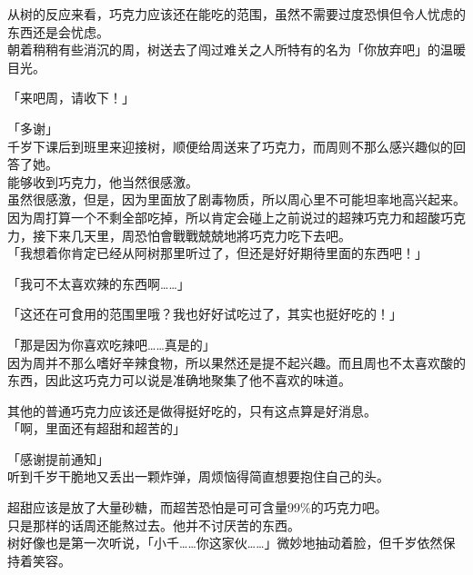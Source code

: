 从树的反应来看，巧克力应该还在能吃的范围，虽然不需要过度恐惧但令人忧虑的东西还是会忧虑。\\

朝着稍稍有些消沉的周，树送去了闯过难关之人所特有的名为「你放弃吧」的温暖目光。\\

\vspace{2\baselineskip}

「来吧周，请收下！」

「多谢」\\

千岁下课后到班里来迎接树，顺便给周送来了巧克力，而周则不那么感兴趣似的回答了她。\\

能够收到巧克力，他当然很感激。\\

虽然很感激，但是，因为里面放了剧毒物质，所以周心里不可能坦率地高兴起来。\\

因为周打算一个不剩全部吃掉，所以肯定会碰上之前说过的超辣巧克力和超酸巧克力，接下来几天里，周恐怕會戰戰兢兢地將巧克力吃下去吧。\\

「我想着你肯定已经从阿树那里听过了，但还是好好期待里面的东西吧！」

「我可不太喜欢辣的东西啊……」

「这还在可食用的范围里哦？我也好好试吃过了，其实也挺好吃的！」

「那是因为你喜欢吃辣吧……真是的」\\

因为周并不那么嗜好辛辣食物，所以果然还是提不起兴趣。而且周也不太喜欢酸的东西，因此这巧克力可以说是准确地聚集了他不喜欢的味道。

其他的普通巧克力应该还是做得挺好吃的，只有这点算是好消息。\\

「啊，里面还有超甜和超苦的」

「感谢提前通知」\\

听到千岁干脆地又丢出一颗炸弹，周烦恼得简直想要抱住自己的头。

超甜应该是放了大量砂糖，而超苦恐怕是可可含量99\%的巧克力吧。\\

只是那样的话周还能熬过去。他并不讨厌苦的东西。\\

树好像也是第一次听说，「小千……你这家伙……」微妙地抽动着脸，但千岁依然保持着笑容。\\

